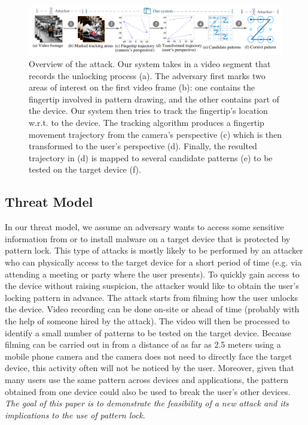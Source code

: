\begin{figure}[!ht]
    \centering
    \includegraphics[width=\textwidth]{fig/overview.pdf}
    \vspace{-4mm}
    \caption{Overview of the attack.
     Our system takes in a video segment that records the unlocking process (a). The adversary first marks two areas of interest on the first video frame (b): one contains the fingertip involved in pattern drawing, and the other contains part of the device. Our system then tries to track the fingertip's location w.r.t. to the device.
     The tracking algorithm produces a fingertip movement trajectory from the camera's perspective (c) which is then transformed to the user's perspective (d). Finally, the resulted trajectory in (d) is mapped to several candidate patterns (e) to be tested on the target device (f). }
    \label{fig:fig2}
    \vspace{-3mm}
\end{figure}

    \subsection{Threat Model}
    \label{sec:scenarios}
        In our threat model, we assume an adversary wants to access some sensitive information from or to install malware on a target device that is protected by pattern lock.
        This type of attacks is mostly likely to be performed by an attacker
         who can physically access to the
        target device for a short period of time (e.g. via  attending a meeting or party where the user presents). To quickly gain access to the device without raising suspicion, the attacker would like to obtain the user's locking pattern in advance.
        The attack starts from filming how the user unlocks the device. Video recording can be done on-site or ahead of time (probably with the help of someone hired by the attack).
        The video will then be processed to identify a small number of patterns to be tested on the target device.
        Because filming can be carried out in from a distance of as far as 2.5 meters using a mobile phone camera and the camera does not need to directly face the target device, this activity often will not be noticed by the user.
        Moreover, given that many users
         use the same pattern across devices and applications, the pattern obtained from one device could also be used to break the user's other devices.  \emph{The goal of this paper is to
        demonstrate the feasibility of a new attack and its implications to
        the use of pattern lock.}
        
